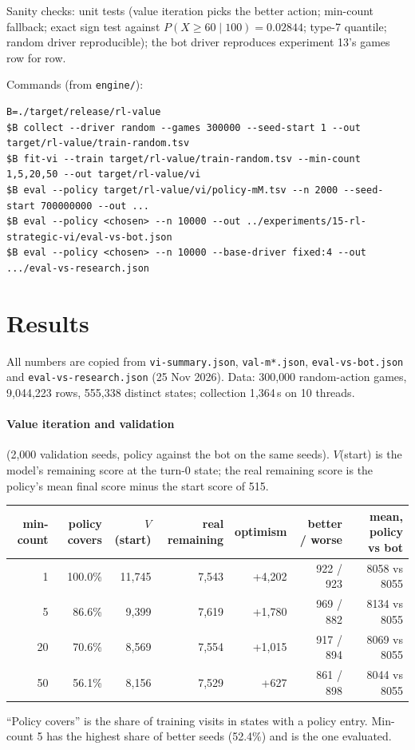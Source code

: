 \documentclass{../polyexp}
\begin{document}
Sanity checks: unit tests (value iteration picks the better action; min-count fallback; exact sign test against
$P(X\ge 60\mid 100) = 0.02844$; type-7 quantile; random driver reproducible); the bot driver reproduces experiment
13's games row for row.

Commands (from \texttt{engine/}):
\begin{verbatim}
B=./target/release/rl-value
$B collect --driver random --games 300000 --seed-start 1 --out target/rl-value/train-random.tsv
$B fit-vi --train target/rl-value/train-random.tsv --min-count 1,5,20,50 --out target/rl-value/vi
$B eval --policy target/rl-value/vi/policy-mM.tsv --n 2000 --seed-start 700000000 --out ...
$B eval --policy <chosen> --n 10000 --out ../experiments/15-rl-strategic-vi/eval-vs-bot.json
$B eval --policy <chosen> --n 10000 --base-driver fixed:4 --out .../eval-vs-research.json
\end{verbatim}

\section{Results}
\ExpResults

All numbers are copied from \texttt{vi-summary.json}, \texttt{val-m*.json}, \texttt{eval-vs-bot.json} and
\texttt{eval-vs-research.json} (25 Nov 2026). Data: 300{,}000 random-action games, 9{,}044{,}223 rows, 555{,}338
distinct states; collection 1{,}364\,s on 10 threads.

\paragraph{Value iteration and validation} (2{,}000 validation seeds, policy against the bot on the same seeds).
$V$(start) is the model's remaining score at the turn-0 state; the real remaining score is the policy's mean
final score minus the start score of 515.

\begin{center}\small
\begin{tabular}{rrrrrrr}
\toprule
min-count & policy covers & $V$(start) & real remaining & optimism & better / worse & mean, policy vs bot \\
\midrule
1  & 100.0\% & 11{,}745 & 7{,}543 & +4{,}202 & 922 / 923 & 8058 vs 8055 \\
5  & 86.6\%  & 9{,}399  & 7{,}619 & +1{,}780 & 969 / 882 & 8134 vs 8055 \\
20 & 70.6\%  & 8{,}569  & 7{,}554 & +1{,}015 & 917 / 894 & 8069 vs 8055 \\
50 & 56.1\%  & 8{,}156  & 7{,}529 & +627     & 861 / 898 & 8044 vs 8055 \\
\bottomrule
\end{tabular}
\end{center}
``Policy covers'' is the share of training visits in states with a policy entry. Min-count 5 has the highest share
of better seeds (52.4\%) and is the one evaluated.
\end{document}
